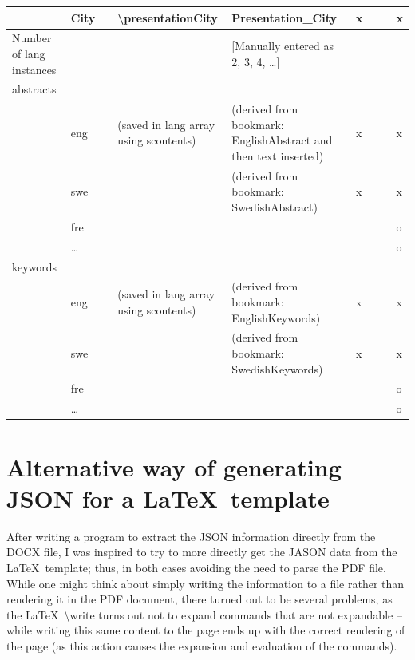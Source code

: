 \begin{landscape}
{\begin{longtable}{L{2cm}|L{4cm}|l|L{4cm}|L{4cm}|l l l l|}
 & City &  & \textbackslash presentationCity{ } & Presentation\_City & x &  &  & x \\
\hline
Number of lang instances &  &  &  & [Manually entered as 2, 3, 4, …] &  &  &  & \\
abstracts & \\
 & eng &  & (saved in lang array using scontents) & (derived from bookmark: EnglishAbstract and then text inserted) & x &  &  & x \\
 & swe &  &  & (derived from bookmark: SwedishAbstract) & x &  &  & x \\
 & fre &  & &  & o\\
 & … &  & &  & o\\
keywords & \\
 & eng &  & (saved in lang array using scontents) & (derived from bookmark: EnglishKeywords) & x &  &  & x \\
 & swe &  &  & (derived from bookmark: SwedishKeywords) & x &  &  & x \\
 & fre &  & &  & o \\
 & … &  & &  & o\\
\hline
\end{longtable}
}
\end{landscape}

\section{Alternative way of generating JSON for a \LaTeX~template}
\label{sec:AlternativeWayofGeneratingJSON}
After writing a program to extract the JSON information directly from the DOCX file, I was inspired to try to more directly get the JASON data from the \LaTeX~template; thus, in both cases avoiding the need to parse the PDF file.
While one might think about simply writing the information to a file rather than rendering it in the PDF document, there turned out to be several problems, as the \LaTeX\ \textbackslash write turns out not to expand commands that are not expandable – while writing this same content to the page ends up with the correct rendering of the page (as this action causes the expansion and evaluation of the commands).

